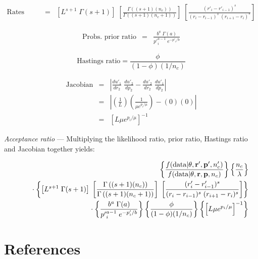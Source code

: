 \documentclass[12pt]{article}
\newcommand{\ncat}{n_c}
\newcommand{\newprobmean}{\mu}
\begin{document}
\begin{eqnarray*}
\mbox{Rates prior ratio} 
  & = & \left[ L^{s+1} \; \Gamma(s+1)\right] \; 
  \left[ \frac{\Gamma\left( (s+1) (\ncat) \right)}{\Gamma\left( (s+1) (\ncat + 1) \right)} \right] \;
  \left[ \frac{(r'_i - r'_{i-1})^s}{(r_i - r_{i-1})^s \; (r_{i+1} - r_i)^s} \right]
\end{eqnarray*}

\begin{eqnarray*}
\mbox{Probs. prior ratio} & = & \frac{ b^a \; \Gamma(a) }{ {p'}_i^{a-1} \; e^{-p'_i/b} } 
\end{eqnarray*}

\[ \mbox{Hastings ratio} = \frac{\phi}{(1-\phi)(1/\ncat)} \]

\begin{eqnarray*}
\mbox{Jacobian} & = & \left| \frac{d u'_1}{d r_2} \; \frac{d u'_2}{d p_2} - \frac{d u'_2}{d r_2} \; \frac{d u'_1}{d p_2} \right| \\
& = & \left| \left( \frac{1}{L} \right) \left( \frac{1}{\newprobmean e^{p_i/\newprobmean}} \right) - (0)(0) \right| \\
& = & \left[ L \newprobmean e^{p_i/\newprobmean} \right]^{-1}
\end{eqnarray*}

{\em Acceptance ratio} --- Multiplying the likelihood ratio, prior ratio, Hastings ratio and Jacobian together yields:

\begin{eqnarray*}
& & \left\{ 
  \frac{f(\mbox{data} | {\bf \theta}, {\bf r}', {\bf p}', \ncat')}{f(\mbox{data} | {\bf \theta}, {\bf r}, {\bf p}, \ncat)} 
\right\}
\left\{ 
  \frac{\ncat}{\lambda} 
\right\} \\
& & \rule{.2in}{.0in} \cdot 
\left\{ 
  \left[ L^{s+1} \; \Gamma(s+1)\right] \; 
  \left[ \frac{\Gamma\left( (s+1) (\ncat) \right)}{\Gamma\left( (s+1) (\ncat + 1) \right)} \right] \;
  \left[ \frac{(r'_i - r'_{i-1})^s}{(r_i - r_{i-1})^s \; (r_{i+1} - r_i)^s} \right]
\right\} \\
& & \rule{.2in}{.0in} \cdot 
\left\{ 
  \frac{ b^a \; \Gamma(a) }{ {p'}_i^{a-1} \; e^{-p'_i/b} } 
\right\} 
\left\{ 
  \frac{\phi}{(1-\phi)(1/\ncat)} 
\right\}
\left\{ 
  \left[ L \newprobmean e^{p_i/\newprobmean} \right]^{-1} 
\right\}
\end{eqnarray*}

\section{References}
\renewcommand{\bibsection}{}

\end{document}

